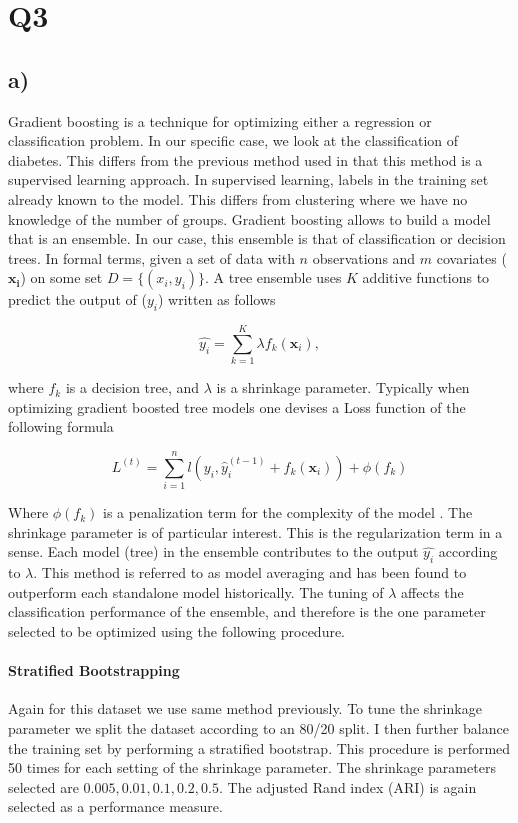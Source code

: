 \documentclass[12pt, centerh1]{article}
\begin{document}
\section*{Q3}
\subsection*{a)}


Gradient boosting is a technique for optimizing either a regression or classification problem. In our specific case, we look at the classification of diabetes. This differs from the previous method used in that this method is a supervised learning approach. In supervised learning, labels in the training set already known to the model. This differs from clustering where we have no knowledge of the number of groups. Gradient boosting allows to build a model that is an ensemble. In our case, this ensemble is that of classification or decision trees. In formal terms, given a set of data with $n$ observations and $m$ covariates ($\bm{x_i}$) on some set $D = \{ (x_i,y_i) \}$. A tree ensemble uses $K$ additive functions to predict the output of ($y_i$) written as follows 

$$ \hat{y_i}  = \sum_{k=1}^K \lambda f_k(\bm{x}_i), $$ 

where $f_k$ is a decision tree, and $\lambda$ is a shrinkage parameter. Typically when optimizing gradient boosted tree models one devises a Loss function of the following formula 

$$L^{(t)} = \sum_{i=1}^n l(y_i, \hat{y}^{(t-1)}_i + f_k(\bm{x}_i)) + \phi(f_k) $$

Where $\phi(f_k)$ is a penalization term for the complexity of the model \citep[see][for specific implementation]{gradientboost}. The shrinkage parameter is of particular interest. This is the regularization term in a sense. Each model (tree) in the ensemble contributes to the output $\hat{y_i} $ according to $\lambda$. This method is referred to as model averaging and has been found to outperform each standalone model historically. The tuning of $\lambda$ affects the classification performance of the ensemble, and therefore is the one parameter selected to be optimized using the following procedure. 

\paragraph{Stratified Bootstrapping}
Again for this dataset we use same method previously. To tune the shrinkage parameter we split the dataset according to an 80/20 split. I then further balance the training set by performing a stratified bootstrap. This procedure is performed 50 times for each setting of the shrinkage parameter. The shrinkage parameters selected are $0.005,0.01,0.1,0.2,0.5$. The adjusted Rand index (ARI) is again selected as a performance measure. 
\end{document}

